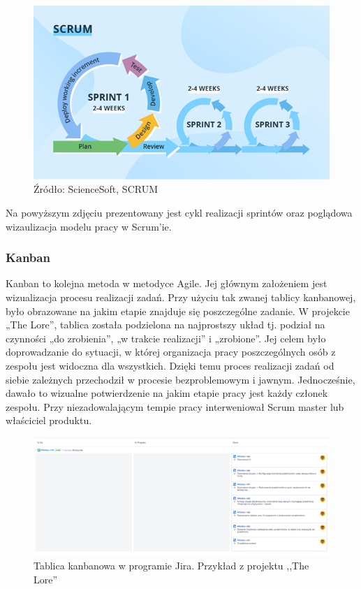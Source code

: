 \documentclass[oneside,polski,logo]{amuthesis}
\begin{document}
\begin{figure}[h]
	\centering
	\includegraphics[width=13cm]{images/hyps/scrum.png}
	\caption{Źródło: ScienceSoft, SCRUM \cite{wykresy}} 
\end{figure}

Na powyższym zdjęciu prezentowany jest cykl realizacji sprintów oraz poglądowa wizaulizacja modelu pracy w Scrum'ie. \\ 

\subsubsection{Kanban}
Kanban to kolejna metoda w metodyce Agile. Jej głównym założeniem jest wizualizacja procesu realizacji zadań. Przy użyciu tak zwanej tablicy kanbanowej, było obrazowane na jakim etapie znajduje się poszczególne zadanie. W projekcie „The Lore”, tablica została podzielona na najprostszy układ tj. podział na czynności „do zrobienia”, „w trakcie realizacji” i  „zrobione”. Jej celem było doprowadzanie do sytuacji, w której organizacja pracy poszczególnych osób z zespołu jest widoczna dla wszystkich. Dzięki temu proces realizacji zadań od siebie zależnych przechodził w procesie bezproblemowym i jawnym. Jednocześnie, dawało to wizualne potwierdzenie na jakim etapie pracy jest każdy członek zespołu. Przy niezadowalającym tempie pracy interweniował Scrum master lub właściciel produktu.\cite{kanban}\\


\begin{figure}[h]
	\centering
	\includegraphics[width=15cm]{images/hyps/jira.png}
	\caption{Tablica kanbanowa w programie Jira. Przykład z projektu ,,The Lore''}
\end{figure}
\end{document}
